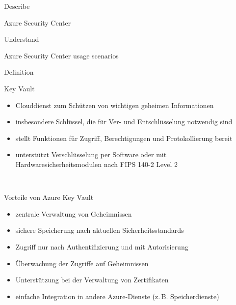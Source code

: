 \documentclass{scrartcl}
\newenvironment{flashcard}[2][]{%
    #1
    \vfill
    \centerline{\Large{#2}}
    \vfill
\newpage
}
{\newpage}
\begin{document}
    \begin{flashcard}[Describe]{Azure Security Center}

    \end{flashcard}

    \begin{flashcard}[Understand]{Azure Security Center usage scenarios}

    \end{flashcard}

    \begin{flashcard}[Definition]{Key Vault}
        \begin{itemize}
            \item Clouddienst zum Schützen von wichtigen geheimen Informationen
            \item insbesondere Schlüssel, die für Ver- und Entschlüsselung notwendig sind
            \item stellt Funktionen für Zugriff, Berechtigungen und Protokollierung bereit
            \item unterstützt Verschlüsselung per Software oder mit Hardwaresicherheitsmodulen nach FIPS 140-2 Level 2
        \end{itemize}
    \end{flashcard}

    \begin{flashcard}[\ ]{Vorteile von Azure Key Vault}
        \begin{itemize}
            \item zentrale Verwaltung von Geheimnissen
            \item sichere Speicherung nach aktuellen Sicherheitsstandards
            \item Zugriff nur nach Authentifizierung und mit Autorisierung
            \item Überwachung der Zugriffe auf Geheimnissen
            \item Unterstützung bei der Verwaltung von Zertifikaten
            \item einfache Integration in andere Azure-Dienste (z.\,B. Speicherdienste)
        \end{itemize}

    \end{flashcard}
\end{document}
